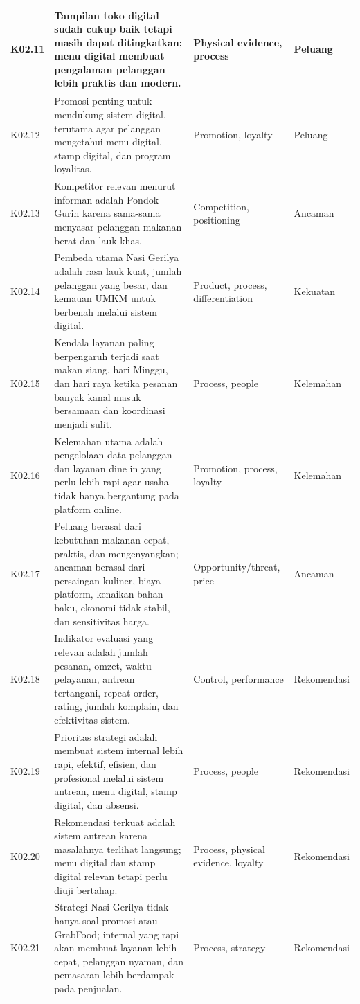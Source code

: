\begin{xltabular}{\textwidth}{|C{1.0cm}|Y|L{2.6cm}|L{2.0cm}|}
K02.11 & Tampilan toko digital sudah cukup baik tetapi masih dapat ditingkatkan; menu digital membuat pengalaman pelanggan lebih praktis dan modern. & Physical evidence, process & Peluang \\ \hline
K02.12 & Promosi penting untuk mendukung sistem digital, terutama agar pelanggan mengetahui menu digital, stamp digital, dan program loyalitas. & Promotion, loyalty & Peluang \\ \hline
K02.13 & Kompetitor relevan menurut informan adalah Pondok Gurih karena sama-sama menyasar pelanggan makanan berat dan lauk khas. & Competition, positioning & Ancaman \\ \hline
K02.14 & Pembeda utama Nasi Gerilya adalah rasa lauk kuat, jumlah pelanggan yang besar, dan kemauan UMKM untuk berbenah melalui sistem digital. & Product, process, differentiation & Kekuatan \\ \hline
K02.15 & Kendala layanan paling berpengaruh terjadi saat makan siang, hari Minggu, dan hari raya ketika pesanan banyak kanal masuk bersamaan dan koordinasi menjadi sulit. & Process, people & Kelemahan \\ \hline
K02.16 & Kelemahan utama adalah pengelolaan data pelanggan dan layanan dine in yang perlu lebih rapi agar usaha tidak hanya bergantung pada platform online. & Promotion, process, loyalty & Kelemahan \\ \hline
K02.17 & Peluang berasal dari kebutuhan makanan cepat, praktis, dan mengenyangkan; ancaman berasal dari persaingan kuliner, biaya platform, kenaikan bahan baku, ekonomi tidak stabil, dan sensitivitas harga. & Opportunity/threat, price & Ancaman \\ \hline
K02.18 & Indikator evaluasi yang relevan adalah jumlah pesanan, omzet, waktu pelayanan, antrean tertangani, repeat order, rating, jumlah komplain, dan efektivitas sistem. & Control, performance & Rekomendasi \\ \hline
K02.19 & Prioritas strategi adalah membuat sistem internal lebih rapi, efektif, efisien, dan profesional melalui sistem antrean, menu digital, stamp digital, dan absensi. & Process, people & Rekomendasi \\ \hline
K02.20 & Rekomendasi terkuat adalah sistem antrean karena masalahnya terlihat langsung; menu digital dan stamp digital relevan tetapi perlu diuji bertahap. & Process, physical evidence, loyalty & Rekomendasi \\ \hline
K02.21 & Strategi Nasi Gerilya tidak hanya soal promosi atau GrabFood; internal yang rapi akan membuat layanan lebih cepat, pelanggan nyaman, dan pemasaran lebih berdampak pada penjualan. & Process, strategy & Rekomendasi \\ \hline

\end{xltabular}
